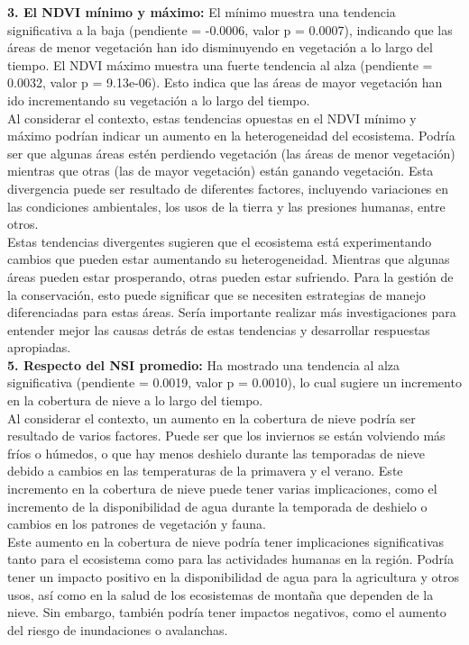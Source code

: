 {\textbf{3.	El NDVI mínimo y máximo:} El mínimo muestra una tendencia significativa a la baja (pendiente = -0.0006, valor p = 0.0007), indicando que las áreas de menor vegetación han ido disminuyendo en vegetación a lo largo del tiempo. El NDVI máximo muestra  una fuerte tendencia al alza (pendiente = 0.0032, valor p = 9.13e-06). Esto indica que las áreas de mayor vegetación han ido incrementando su vegetación a lo largo del tiempo.\\

Al considerar el contexto, estas tendencias opuestas en el NDVI mínimo y máximo podrían indicar un aumento en la heterogeneidad del ecosistema. Podría ser que algunas áreas estén perdiendo vegetación (las áreas de menor vegetación) mientras que otras (las de mayor vegetación) están ganando vegetación. Esta divergencia puede ser resultado de diferentes factores, incluyendo variaciones en las condiciones ambientales, los usos de la tierra y las presiones humanas, entre otros.\\

Estas tendencias divergentes sugieren que el ecosistema está experimentando cambios que pueden estar aumentando su heterogeneidad. Mientras que algunas áreas pueden estar prosperando, otras pueden estar sufriendo. Para la gestión de la conservación, esto puede significar que se necesiten estrategias de manejo diferenciadas para estas áreas. Sería importante realizar más investigaciones para entender mejor las causas detrás de estas tendencias y desarrollar respuestas apropiadas.\\


\textbf{5.	Respecto del NSI promedio: } Ha mostrado una tendencia al alza significativa (pendiente = 0.0019, valor p = 0.0010), lo cual sugiere un incremento en la cobertura de nieve a lo largo del tiempo.\\

Al considerar el contexto, un aumento en la cobertura de nieve podría ser resultado de varios factores. Puede ser que los inviernos se están volviendo más fríos o húmedos, o que hay menos deshielo durante las temporadas de nieve debido a cambios en las temperaturas de la primavera y el verano. Este incremento en la cobertura de nieve puede tener varias implicaciones, como el incremento de la disponibilidad de agua durante la temporada de deshielo o cambios en los patrones de vegetación y fauna.\\

Este aumento en la cobertura de nieve podría tener implicaciones significativas tanto para el ecosistema como para las actividades humanas en la región. Podría tener un impacto positivo en la disponibilidad de agua para la agricultura y otros usos, así como en la salud de los ecosistemas de montaña que dependen de la nieve. Sin embargo, también podría tener impactos negativos, como el aumento del riesgo de inundaciones o avalanchas. \\

}
